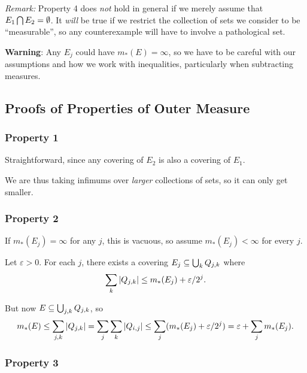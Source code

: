\emph{Remark:} Property 4 does \emph{not} hold in general if we merely
assume that \(E_1 \bigcap E_2 = \emptyset\). It \emph{will} be true
if we restrict the collection of sets we consider to be ``measurable'',
so any counterexample will have to involve a pathological set.

\textbf{Warning}: Any \(E_j\) could have \(m_*(E) = \infty\), so we have
to be careful with our assumptions and how we work with inequalities,
particularly when subtracting measures.

\hypertarget{proofs-of-properties-of-outer-measure}{%
\subsection{Proofs of Properties of Outer
Measure}\label{proofs-of-properties-of-outer-measure}}

\hypertarget{property-1}{%
\subsubsection{Property 1}\label{property-1}}

Straightforward, since any covering of \(E_2\) is also a covering of
\(E_1\).

We are thus taking infimums over \emph{larger} collections of sets, so
it can only get smaller.

\hypertarget{property-2}{%
\subsubsection{Property 2}\label{property-2}}

If \(m_*(E_j) = \infty\) for any \(j\), this is vacuous, so assume
\(m_*(E_j) < \infty\) for every \(j\).

Let \(\varepsilon > 0\). For each \(j\), there exists a covering
\(E_j \subseteq \bigcup_k Q_{j, k}\) where
\begin{align*}
\sum_k {\left\lvert {Q_{j,k}} \right\rvert} \leq m_*(E_j) + \varepsilon / 2^j
.\end{align*}

But now \(E \subseteq \bigcup_{j, k} Q_{j, k}\), so
\begin{align*}
m_*(E) \leq \sum_{j, k} {\left\lvert {Q_{j, k}} \right\rvert} = \sum_j \sum_k {\left\lvert {Q_{i, j}} \right\rvert} \leq \sum_j (m_*(E_j) + \varepsilon/2^j) = \varepsilon + \sum_j m_*(E_j).
\end{align*}

\hypertarget{property-3}{%
\subsubsection{Property 3}\label{property-3}}

